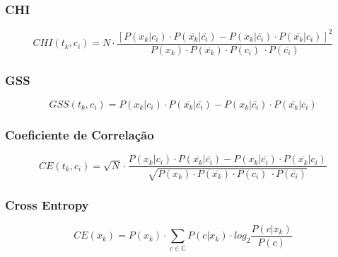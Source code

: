\subsubsection{CHI}
\label{subsubsection::chi}

\cite{Zheng03}
\begin{equation}\label{eqn::chi}
   CHI(t_k, c_i) = N \cdot \frac{ [ P(x_k|c_i) \cdot P(\overline{x_k}|\overline{c_i}) - P(x_k|\overline{c_i}) \cdot P(\overline{x_k}|c_i) ]^2 } {P(x_k) \cdot P(\overline{x_k}) \cdot P(c_i) \ \cdot P(\overline{c_i}) }
\end{equation}

\subsubsection{GSS}
\label{subsubsection::gss}

\begin{equation}\label{eqn::gss}
   GSS(t_k, c_i) = P(x_k|c_i) \cdot P(\overline{x_k}|\overline{c_i}) - P(x_k|\overline{c_i}) \cdot P(\overline{x_k}|c_i) 
\end{equation}

\subsubsection{Coeficiente de Correlação}
\label{subsubsection::cc}
\cite{Zheng03}
\begin{equation}\label{eqn::ce}
   CE(t_k, c_i) = \sqrt{N} \cdot \frac{ P(x_k|c_i) \cdot P(\overline{x_k}|\overline{c_i}) - P(x_k|\overline{c_i}) \cdot P(\overline{x_k}|c_i) } {\sqrt{ P(x_k) \cdot P(\overline{x_k}) \cdot P(c_i) \ \cdot P(\overline{c_i}) } }
\end{equation}

\subsubsection{Cross Entropy}
\label{subsubsection::}
\cite{Shang07}
\begin{equation}\label{eqn::ce}
   CE(x_k) =  P(x_k) \cdot \sum_{c \in \mathbb{C}} P(c|x_k) \cdot log_2 \frac{ P(c|x_k) } { P(c) }
\end{equation}

